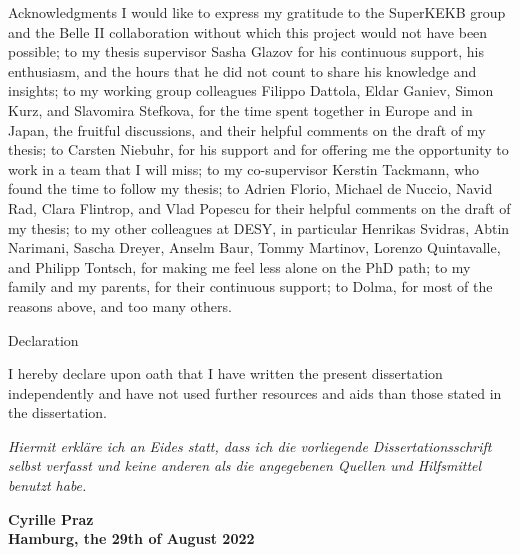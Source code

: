 \begin{abstractpage}{Acknowledgments}
I would like to express my gratitude to the SuperKEKB group and the Belle II collaboration without which this project would not have been possible;
to my thesis supervisor Sasha Glazov for his continuous support, his enthusiasm, and the hours that he did not count to share his knowledge and insights;
to my working group colleagues Filippo Dattola, Eldar Ganiev, Simon Kurz, and Slavomira Stefkova, for the time spent together in Europe and in Japan, the fruitful discussions, and their helpful comments on the draft of my thesis;
to Carsten Niebuhr, for his support and for offering me the opportunity to work in a team that I will miss;
to my co-supervisor Kerstin Tackmann, who found the time to follow my thesis;
to Adrien Florio, Michael de Nuccio, Navid Rad, Clara Flintrop, and Vlad Popescu for their helpful comments on the draft of my thesis;
to my other colleagues at DESY, in particular Henrikas Svidras, Abtin Narimani, Sascha Dreyer, Anselm Baur, Tommy Martinov, Lorenzo Quintavalle, and Philipp Tontsch, for making me feel less alone on the PhD path;
to my family and my parents, for their continuous support;
to Dolma, for most of the reasons above, and too many others.

\end{abstractpage}
\begin{abstractpage}{Declaration}

I hereby declare upon oath that I have written the present dissertation independently and have not used further resources and aids than those stated in the dissertation.

\textit{Hiermit erkläre ich an Eides statt, dass ich die vorliegende Dissertationsschrift selbst verfasst und keine anderen als die angegebenen Quellen und Hilfsmittel benutzt habe.}
\par\bigskip
\par\bigskip

\begin{flushright}
\par\bigskip
\textbf{Cyrille Praz}\\
\textbf{Hamburg, the 29th of August 2022}
\end{flushright}
\end{abstractpage}
